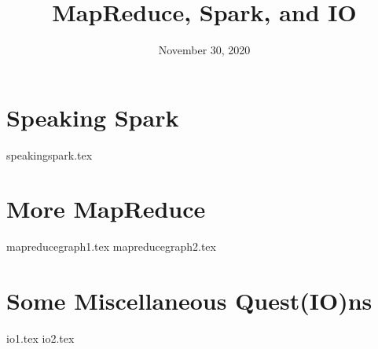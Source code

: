 \documentclass[11pt]{exam}
\title{MapReduce, Spark, and IO}
\date{November 30, 2020}
\begin{document}
\maketitle

\section{Speaking Spark}
\begin{questions}
{speakingspark.tex}
\end{questions}
\newpage

\section{More MapReduce}
\begin{questions}
{mapreducegraph1.tex}
{mapreducegraph2.tex}
\end{questions}
\newpage

\section{Some Miscellaneous Quest(I\/O)ns}
\begin{questions}
{io1.tex}
{io2.tex}
\end{questions}
\newpage
\end{document}
